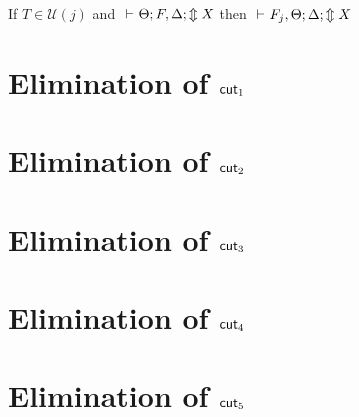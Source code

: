 \documentclass[12pt]{article}
\begin{document}
\begin{theorem}[$\A_l$]
	If $T\in\mathcal{U}(j)$ and	$\mbox{\ $\vdash$\ } \Theta;F,\Delta;\Updownarrow X$ then $\mbox{\ $\vdash$\ } F_j,\Theta;\Delta;\Updownarrow X$
\end{theorem}

\newpage
\section{Elimination of $\mathsf{cut}_1$}

\newpage
\section{Elimination of $\mathsf{cut}_2$}

\newpage
\section{Elimination of $\mathsf{cut}_3$}

\newpage
\section{Elimination of $\mathsf{cut}_4$}

\newpage
\section{Elimination of $\mathsf{cut}_5$}

\end{document}
